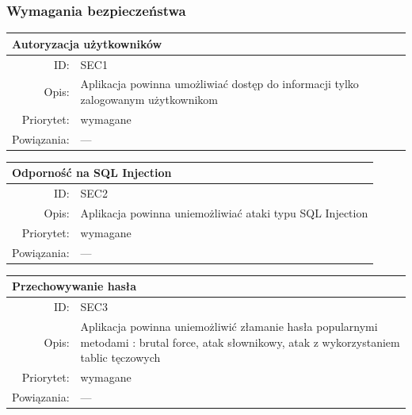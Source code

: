 \subsubsection{Wymagania bezpieczeństwa}
\begin{center}
      \begin{tabular}{rp{10cm}}
	      \multicolumn{2}{l}{\textbf{Autoryzacja użytkowników}} \\
	      \hline
	      ID: & SEC1 \\
	      Opis: & Aplikacja powinna umożliwiać dostęp do informacji tylko zalogowanym użytkownikom \\
	      Priorytet: & wymagane \\
	      Powiązania: & --- \\
    \end{tabular}
\end{center}

\begin{center}
      \begin{tabular}{rp{10cm}}
	      \multicolumn{2}{l}{\textbf{Odporność na SQL Injection}} \\
	      \hline
	      ID: & SEC2 \\
	      Opis: & Aplikacja powinna uniemożliwiać ataki typu SQL Injection \\
	      Priorytet: & wymagane \\
	      Powiązania: & --- \\
    \end{tabular}
\end{center}

\begin{center}
      \begin{tabular}{rp{10cm}}
	      \multicolumn{2}{l}{\textbf{Przechowywanie hasła}} \\
	      \hline
	      ID: & SEC3 \\
	      Opis: & Aplikacja powinna uniemożliwić złamanie hasła popularnymi metodami : brutal force, atak słownikowy, atak z wykorzystaniem tablic tęczowych \\
	      Priorytet: & wymagane \\
	      Powiązania: & --- \\
    \end{tabular}
\end{center}

